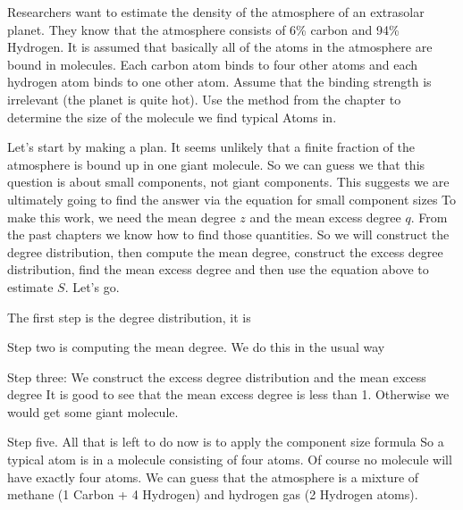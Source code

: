 Researchers want to estimate the density of the atmosphere of an extrasolar planet. They know that the atmosphere consists of 6\% carbon and 94\% Hydrogen. It is assumed that basically all of the atoms in the atmosphere are bound in molecules. Each carbon atom binds to four other atoms and each hydrogen atom binds to one other atom. Assume that the binding strength is irrelevant (the planet is quite hot). Use the method from the chapter to determine the size of the molecule we find typical Atoms in. 

\solution
Let's start by making a plan. It seems unlikely that a finite fraction of the atmosphere is bound up in one giant molecule. So we can guess we that this question is about small components, not giant components. This suggests we are ultimately going to find the answer via the equation for small component sizes
To make this work, we need the mean degree $z$ and the mean excess degree $q$. From the past chapters we know how to find those quantities. So we will construct the degree distribution, then compute the mean degree, construct the excess degree distribution, find the mean excess degree and then use the equation above to estimate $S$. Let's go.

The first step is the degree distribution, it is 

Step two is computing the mean degree. We do this in the usual way

Step three: We construct the excess degree distribution 
and the mean excess degree
It is good to see that the mean excess degree is less than 1. Otherwise we would get some giant molecule. 

Step five. All that is left to do now is to apply the component size formula
So a typical atom is in a molecule consisting of four atoms. Of course no molecule will have exactly four atoms. We can guess that the atmosphere is a mixture of methane (1 Carbon + 4 Hydrogen) and hydrogen gas (2 Hydrogen atoms). 